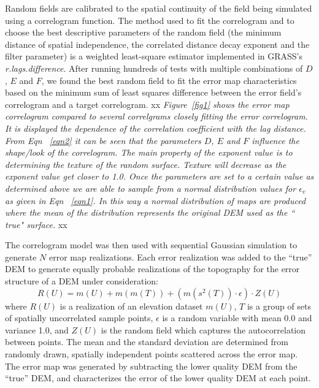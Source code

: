 \documentclass[12pt]{article}
\begin{document}
Random fields are calibrated to the spatial continuity of the field
being simulated using a correlogram function. The method used to fit
the correlogram and to choose the best descriptive parameters of the
random field (the minimum distance of spatial independence, the
correlated distance decay exponent and the filter parameter) is a
weighted least-square estimator implemented in GRASS's
\textit{r.lags.difference}.  After running hundreds of tests with
multiple combinations of $D$, $E$ and $F$, we found the best random
field to fit the error map characteristics based on the minimum sum of
least squares difference between the error field's correlogram and a
target correlogram. xx \textit{Figure~\ref{fig1} shows the error map
correlogram compared to several correlgrams closely fitting the error 
correlogram. It is displayed the dependence of the correlation coefficient with 
the lag distance. From Eqn ~\ref{eqn2} it can be seen that the parameters
$D$, $E$ and $F$ influence the shape/look of the correlogram.
The main property of the exponent value is to determining the texture 
of the random surface. Texture will decrease as the exponent value get closer to 1.0.
Once the parameters are set to
a certain value as determined above we are able to sample from a normal distribution
values for $\epsilon_v$ as given in Eqn ~\ref{eqn1}. In this way a normal distribution of maps 
are produced where the mean of the distribution represents the original DEM used as the `` true" surface.
}xx


The correlogram model was then used with sequential Gaussian
simulation to generate $N$ error map realizations.  Each error
realization was added to the ``true'' DEM to generate equally probable
realizations of the topography for the error structure of a DEM under
consideration:
\begin{equation}
 R(U)=m(U)+m(m(T))+(m(s^2(T))\cdot \epsilon)\cdot Z(U)
\label{eq:one}
\end{equation} 
where $R(U)$ is a realization of an elevation dataset $m(U)$, $T$ is a
group of sets of spatially uncorrelated sample points, $\epsilon$ is a
random variable with mean 0.0 and variance 1.0, and $Z(U)$ is the
random field which captures the autocorrelation between points.  The
mean and the standard deviation are determined from randomly drawn,
spatially independent points scattered across the error map. The error
map was generated by subtracting the lower quality DEM from the
``true'' DEM, and characterizes the error of the lower quality DEM at
each point.
\end{document}
